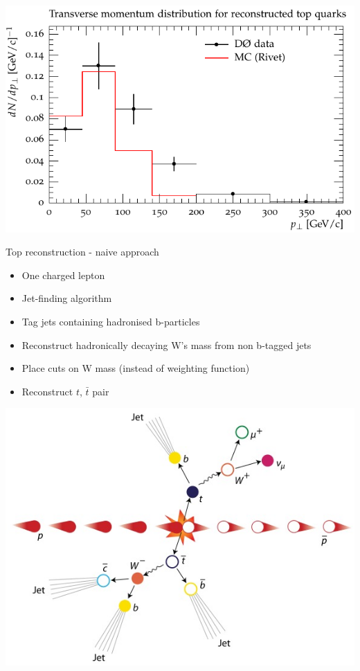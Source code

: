 \documentclass{beamer}
\begin{document}
  \begin{frame}
    \includegraphics[width=\textwidth]{top_paper}
  \end{frame}

  \begin{frame}{Top reconstruction - naive approach}
    \begin{itemize}[<uncover@+>]
      \item One charged lepton
      \item Jet-finding algorithm
      \item Tag jets containing hadronised b-particles 
      \item Reconstruct hadronically decaying W's mass from non b-tagged jets
      \item Place cuts on W mass (instead of weighting function)
      \item Reconstruct $t$, $\bar{t}$ pair
    \end{itemize}
    \includegraphics[height=0.4\textheight]{ttbar.jpg}
  \end{frame}
\end{document}
